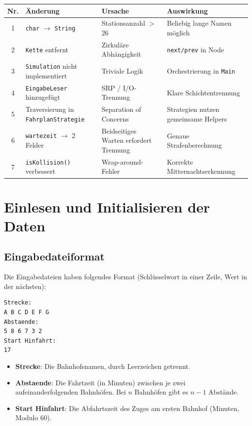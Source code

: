 \documentclass[12pt,a4paper]{article}
\begin{document}
\begin{center}
\begin{tabular}{clll}
\toprule
\textbf{Nr.} & \textbf{Änderung}                     & \textbf{Ursache}                        & \textbf{Auswirkung}             \\
\midrule
1 & \texttt{char} $\to$ \texttt{String}          & Stationsanzahl $>$ 26                   & Beliebig lange Namen möglich    \\
2 & \texttt{Kette} entfernt                       & Zirkuläre Abhängigkeit                  & \texttt{next/prev} in Node      \\
3 & \texttt{Simulation} nicht implementiert       & Triviale Logik                          & Orchestrierung in \texttt{Main} \\
4 & \texttt{EingabeLeser} hinzugefügt             & SRP / I/O-Trennung                      & Klare Schichtentrennung         \\
5 & Traversierung in \texttt{FahrplanStrategie}   & Separation of Concerns                  & Strategien nutzen gemeinsame Helpers \\
6 & \texttt{wartezeit} $\to$ 2 Felder             & Beidseitiges Warten erfordert Trennung  & Genaue Strafenberechnung        \\
7 & \texttt{isKollision()} verbessert             & Wrap-around-Fehler                      & Korrekte Mitternachtserkennung  \\
\bottomrule
\end{tabular}
\end{center}

\section{Einlesen und Initialisieren der Daten}

\subsection{Eingabedateiformat}

Die Eingabedateien haben folgendes Format (Schlüsselwort in einer Zeile, Wert in der nächsten):

\begin{verbatim}
Strecke:
A B C D E F G
Abstaende:
5 8 6 7 3 2
Start Hinfahrt:
17
\end{verbatim}

\begin{itemize}
    \item \textbf{Strecke}: Die Bahnhofsnamen, durch Leerzeichen getrennt.
    \item \textbf{Abstaende}: Die Fahrtzeit (in Minuten) zwischen je zwei aufeinanderfolgenden Bahnhöfen. Bei $n$ Bahnhöfen gibt es $n-1$ Abstände.
    \item \textbf{Start Hinfahrt}: Die Abfahrtszeit des Zuges am ersten Bahnhof (Minuten, Modulo 60).
\end{itemize}
\end{document}

